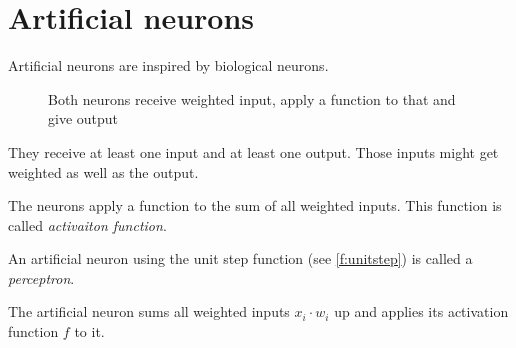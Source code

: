 \section{Artificial neurons}\label{sec:artificial-neurons}

Artificial neurons are inspired by biological neurons.

\begin{figure}[ht]
    \centering
    \label{fig:artificial-and-biological-neuron}
    \caption{Both neurons receive weighted input, apply a function to that and give output}
\end{figure}

They receive at least one
input and at least one output. Those inputs might get weighted as well as the
output.

The neurons apply a function to the sum of all weighted inputs. This function
is called \textit{activaiton function}.

An artificial neuron using the unit step function (see \cref{f:unitstep}) is called
a \textit{perceptron}.


The artificial neuron sums all weighted inputs $x_i \cdot w_i$ up
             and applies its activation function $f$ to it.